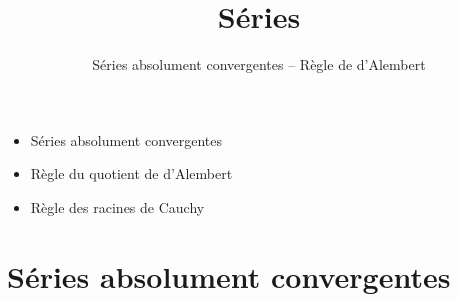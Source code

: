 


   





\title{{\bf Séries}}
\subtitle{Séries absolument convergentes -- Règle de d'Alembert}

\begin{frame}
  
  \debutmontitre

  \pause

{\footnotesize
\hfill
{}
\begin{minipage}{0.6\textwidth}
  \begin{itemize}
    \item<3-> Séries absolument convergentes
    \item<4-> Règle du quotient de d'Alembert
    \item<5-> Règle des racines de Cauchy
  \end{itemize}
\end{minipage}
}

\end{frame}

\setcounter{framenumber}{0}



\section{Séries absolument convergentes}

